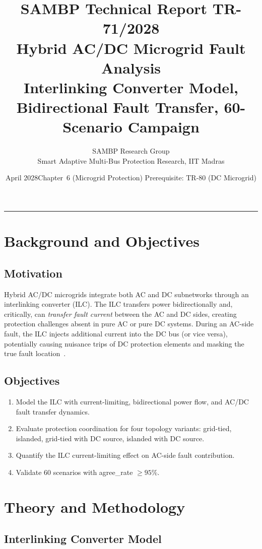 \documentclass[11pt, a4paper]{article}
\title{\textbf{\textsf{\color{sambpblue}SAMBP Technical Report TR-71/2028}}\\[6pt]
  \Large Hybrid AC/DC Microgrid Fault Analysis\\[4pt]
  \normalsize Interlinking Converter Model, Bidirectional Fault Transfer,
  60-Scenario Campaign}
\author{SAMBP Research Group\\[2pt]
  \small Smart Adaptive Multi-Bus Protection Research, IIT Madras}
\date{April 2028\quad\textbar\quad Chapter~6 (Microgrid Protection)\quad\textbar\quad
  Prerequisite: TR-80 (DC Microgrid)}
\begin{document}
\maketitle
\tableofcontents
\vspace{6pt}\hrule\vspace{10pt}

\section{Background and Objectives}
\label{sec:background}

\subsection{Motivation}

Hybrid AC/DC microgrids integrate both AC and DC subnetworks through
an interlinking converter (ILC). The ILC transfers power bidirectionally
and, critically, can \emph{transfer fault current} between the AC and DC
sides, creating protection challenges absent in pure AC or pure DC systems.
During an AC-side fault, the ILC injects additional current into the DC bus
(or vice versa), potentially causing nuisance trips of DC protection elements
and masking the true fault location~\cite{Lotfi2016}.

\subsection{Objectives}

\begin{enumerate}
  \item Model the ILC with current-limiting, bidirectional power flow, and
    AC/DC fault transfer dynamics.
  \item Evaluate protection coordination for four topology variants:
    grid-tied, islanded, grid-tied with DC source, islanded with DC source.
  \item Quantify the ILC current-limiting effect on AC-side fault contribution.
  \item Validate 60 scenarios with agree\_rate $\geq 95\%$.
\end{enumerate}

\section{Theory and Methodology}
\label{sec:theory}

\subsection{Interlinking Converter Model}
\end{document}
